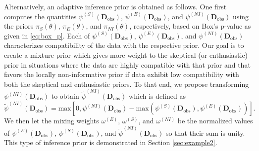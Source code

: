 \documentclass[useAMS,usenatbib,referee]{biom}
\begin{document}
{
Alternatively, an adaptive inference prior is obtained as follows.
One first computes the quantities $\psi^{(S)}(\mathbf{D}_{\text{obs}})$, $\psi^{(E)}(\mathbf{D}_{\text{obs}})$, and $\psi^{(NI)}(\mathbf{D}_{\text{obs}})$ using the priors $\pi_S(\theta)$, 
$\pi_E(\theta)$, and $\pi_{NI}(\theta)$, respectively, based on Box's p-value as given in \eqref{eq:box_p}. 
Each of $\psi^{(S)}(\mathbf{D}_{\text{obs}})$, $\psi^{(E)}(\mathbf{D}_{\text{obs}})$, and $\psi^{(NI)}(\mathbf{D}_{\text{obs}})$ characterizes compatibility of the data with the respective prior.
Our goal is to create a mixture prior which gives more weight to the skeptical (or enthusiastic) prior in situations where the data are highly compatible 
with that prior and that favors the locally non-informative prior if data exhibit low compatibility with both the skeptical and enthusiastic priors.
 To that end, we propose transforming $\psi^{(NI)}(\mathbf{D}_{\text{obs}})$ to obtain $\tilde{\psi}^{(NI)}(\mathbf{D}_{\text{obs}})$ which is defined as
\begin{equation}\label{eq:3partmix_ni}
\tilde{\psi}^{(NI)}(\mathbf{D}_{\text{obs}})=\text{max}\left[0,\psi^{(NI)}(\mathbf{D}_{\text{obs}})-\text{max}\left(\psi^{(S)}(\mathbf{D}_{\text{obs}}),\psi^{(E)}(\mathbf{D}_{\text{obs}})\right)\right].
\end{equation}	
We then let the mixing weights $\omega^{(E)}$, $\omega^{(S)}$, and $\omega^{(NI)}$ be the normalized values of $\psi^{(E)}(\mathbf{D}_{\text{obs}})$, $\psi^{(S)}(\mathbf{D}_{\text{obs}})$, and $\tilde{\psi}^{(NI)}(\mathbf{D}_{\text{obs}})$ so that their sum is unity.
This type of inference prior is demonstrated in Section \ref{sec:example2}.
}
\end{document}
